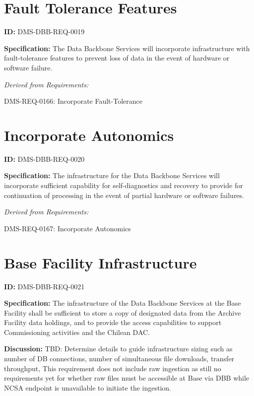 \documentclass[SE,toc,lsstdraft]{lsstdoc}
\begin{document}
\section{Fault Tolerance Features}

\label{DMS-DBB-REQ-0019}
\textbf{ID:} DMS-DBB-REQ-0019

\textbf{Specification:}
The Data Backbone Services will incorporate infrastructure with fault-tolerance features to prevent loss of data in the event of hardware or software failure.

\emph{Derived from Requirements:}

DMS-REQ-0166:
Incorporate Fault-Tolerance \newline

\section{Incorporate Autonomics}

\label{DMS-DBB-REQ-0020}
\textbf{ID:} DMS-DBB-REQ-0020

\textbf{Specification:}
The infrastructure for the Data Backbone Services will incorporate sufficient capability for self-diagnostics and recovery to provide for continuation of processing in the event of partial hardware or software failures.

\emph{Derived from Requirements:}

DMS-REQ-0167:
Incorporate Autonomics \newline

\section{Base Facility Infrastructure}

\label{DMS-DBB-REQ-0021}
\textbf{ID:} DMS-DBB-REQ-0021

\textbf{Specification:}
The infrastructure of the Data Backbone Services at the Base Facility shall be sufficient to store a copy of designated data from the Archive Facility data holdings, and to provide the access capabilities to support Commissioning activities and the Chilean DAC.

\textbf{Discussion:}
TBD:  Determine details to guide infrastructure sizing such as number of DB connections, number of simultaneous file downloads, transfer throughput,    This requirement does not include raw ingestion as still no requirements yet for whether raw files must be accessible at Base via DBB while NCSA endpoint is unavailable to initiate the ingestion.
\end{document}
